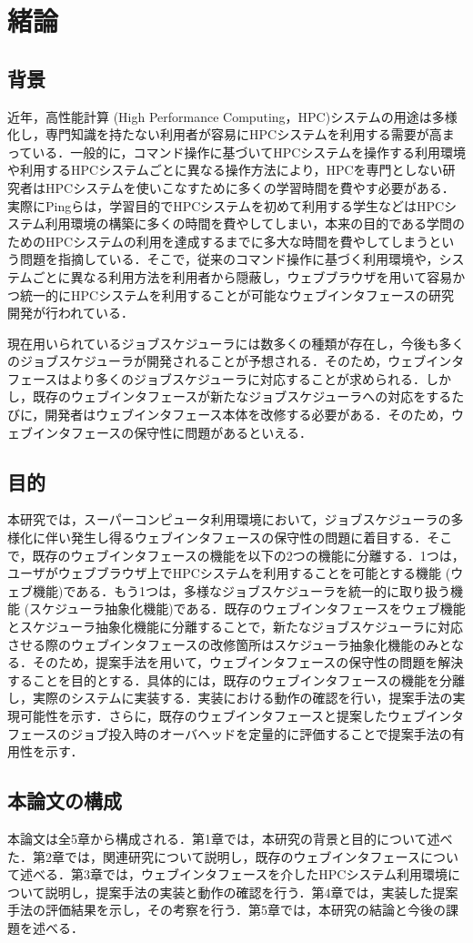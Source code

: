 
\section{緒論}
\subsection{背景}
近年，高性能計算 (High Performance Computing，HPC)システムの用途は多様化し，専門知識を持たない利用者が容易にHPCシステムを利用する需要が高まっている．一般的に，コマンド操作に基づいてHPCシステムを操作する利用環境や利用するHPCシステムごとに異なる操作方法により，HPCを専門としない研究者はHPCシステムを使いこなすために多くの学習時間を費やす必要がある．実際にPingらは，学習目的でHPCシステムを初めて利用する学生などはHPCシステム利用環境の構築に多くの時間を費やしてしまい，本来の目的である学問のためのHPCシステムの利用を達成するまでに多大な時間を費やしてしまうという問題を指摘している\cite{cite1}．そこで，従来のコマンド操作に基づく利用環境や，システムごとに異なる利用方法を利用者から隠蔽し，ウェブブラウザを用いて容易かつ統一的にHPCシステムを利用することが可能なウェブインタフェースの研究開発が行われている\cite{OOD_1}．\par
現在用いられているジョブスケジューラには数多くの種類が存在し，今後も多くのジョブスケジューラが開発されることが予想される．そのため，ウェブインタフェースはより多くのジョブスケジューラに対応することが求められる．しかし，既存のウェブインタフェースが新たなジョブスケジューラへの対応をするたびに，開発者はウェブインタフェース本体を改修する必要がある．そのため，ウェブインタフェースの保守性に問題があるといえる．\par

\subsection{目的}
本研究では，スーパーコンピュータ利用環境において，ジョブスケジューラの多様化に伴い発生し得るウェブインタフェースの保守性の問題に着目する．そこで，既存のウェブインタフェースの機能を以下の2つの機能に分離する．1つは，ユーザがウェブブラウザ上でHPCシステムを利用することを可能とする機能 (ウェブ機能)である．もう1つは，多様なジョブスケジューラを統一的に取り扱う機能 (スケジューラ抽象化機能)である．既存のウェブインタフェースをウェブ機能とスケジューラ抽象化機能に分離することで，新たなジョブスケジューラに対応させる際のウェブインタフェースの改修箇所はスケジューラ抽象化機能のみとなる．そのため，提案手法を用いて，ウェブインタフェースの保守性の問題を解決することを目的とする．具体的には，既存のウェブインタフェースの機能を分離し，実際のシステムに実装する．実装における動作の確認を行い，提案手法の実現可能性を示す．さらに，既存のウェブインタフェースと提案したウェブインタフェースのジョブ投入時のオーバヘッドを定量的に評価することで提案手法の有用性を示す．\par

\subsection{本論文の構成}
本論文は全5章から構成される．第1章では，本研究の背景と目的について述べた．第2章では，関連研究について説明し，既存のウェブインタフェースについて述べる．第3章では，ウェブインタフェースを介したHPCシステム利用環境について説明し，提案手法の実装と動作の確認を行う．第4章では，実装した提案手法の評価結果を示し，その考察を行う．第5章では，本研究の結論と今後の課題を述べる．\par
